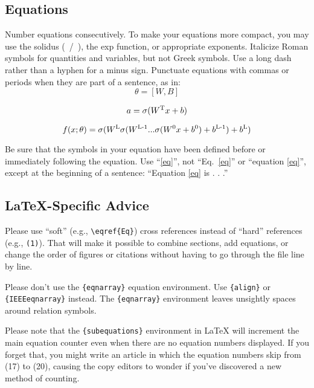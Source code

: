 \documentclass[conference]{IEEEtran}
\begin{document}
\subsection{Equations}
Number equations consecutively. To make your 
equations more compact, you may use the solidus (~/~), the exp function, or 
appropriate exponents. Italicize Roman symbols for quantities and variables, 
but not Greek symbols. Use a long dash rather than a hyphen for a minus 
sign. Punctuate equations with commas or periods when they are part of a 
sentence, as in:
\begin{equation}
\theta={[W,B]}
\end{equation}

\begin{equation}
a=\sigma(W\textsuperscript{T}x+b)\label{eq}
\end{equation}

\begin{equation}
f(x;\theta)=\sigma(W\textsuperscript{L}\sigma(W\textsuperscript{L-1}...\sigma(W\textsuperscript{0}x+b\textsuperscript{0})+b\textsuperscript{L-1})+b\textsuperscript{L})\label{eq}
\end{equation}


Be sure that the 
symbols in your equation have been defined before or immediately following 
the equation. Use ``\eqref{eq}'', not ``Eq.~\eqref{eq}'' or ``equation \eqref{eq}'', except at 
the beginning of a sentence: ``Equation \eqref{eq} is . . .''

\subsection{\LaTeX-Specific Advice}

Please use ``soft'' (e.g., \verb|\eqref{Eq}|) cross references instead
of ``hard'' references (e.g., \verb|(1)|). That will make it possible
to combine sections, add equations, or change the order of figures or
citations without having to go through the file line by line.

Please don't use the \verb|{eqnarray}| equation environment. Use
\verb|{align}| or \verb|{IEEEeqnarray}| instead. The \verb|{eqnarray}|
environment leaves unsightly spaces around relation symbols.

Please note that the \verb|{subequations}| environment in {\LaTeX}
will increment the main equation counter even when there are no
equation numbers displayed. If you forget that, you might write an
article in which the equation numbers skip from (17) to (20), causing
the copy editors to wonder if you've discovered a new method of
counting.
\end{document}
